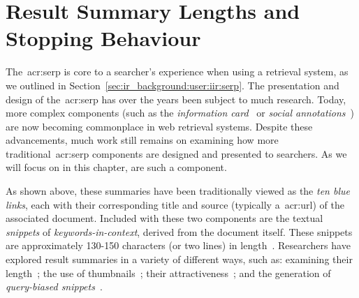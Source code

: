 
\chapter[Result Summary Lengths and Stopping Behaviour]{Result Summary Lengths and\\Stopping Behaviour}\label{chap:snippets}
The~\gls{acr:serp} is core to a searcher's experience when using a retrieval system, as we outlined in Section~\ref{sec:ir_background:user:iir:serp}. The presentation and design of the~\gls{acr:serp} has over the years been subject to much research. Today, more complex components (such as the \emph{information card}~\citep{navalpakkam2013non_linear_serp} or \emph{social annotations}~\citep{muralidharan2012social_annotations}) are now becoming commonplace in web retrieval systems. Despite these advancements, much work still remains on examining how more traditional~\gls{acr:serp} components are designed and presented to searchers. As we will focus on in this chapter, \emph{} are such a component.

\begin{figure}[h]
    \centering
    \vspace{4mm}
    \label{fig:serpintro}
    \vspace{-5mm}
\end{figure}

As shown above, these summaries have been traditionally viewed as the \emph{ten blue links}, each with their corresponding title and source (typically a~\gls{acr:url}) of the associated document. Included with these two components are the textual \emph{snippets} of \emph{keywords-in-context}, derived from the document itself. These snippets are approximately 130-150 characters (or two lines) in length~\citep{hearst2009_search}. Researchers have explored result summaries in a variety of different ways, such as: examining their length~\citep{paek2004wavelens,cutrell2007eye_tracking,kaisser2008improving}; the use of thumbnails~\citep{woodruff2002summaries,teevan2009visual_snippets}; their attractiveness~\citep{clarke2007caption_features,he2012bridging}; and the generation of \emph{query-biased snippets}~\citep{tombros1998query_biased,rose2007snippet_attributes}.

